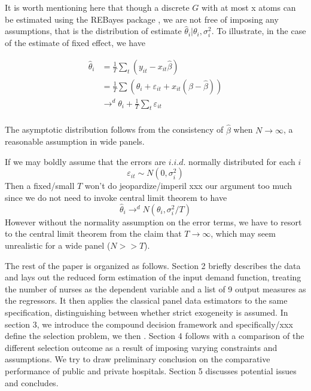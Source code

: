 \documentclass[12pt]{article}
\begin{document}
It is worth mentioning here that though a discrete $G$ with at most x atoms can
be estimated using the REBayes package \cite{koenker2017rebayes}, we are not
free of imposing any assumptions, that is the distribution of estimate
$\hat{\theta}_i|\theta_i,\sigma_i^2.$ To illustrate, in the case of the
estimate of fixed effect, we have

\begin{align*}
    \hat{\theta}_i & =\frac{1}{T}\sum_t (y_{it}-x_{it}\hat{\beta})                         \\
                   & =\frac{1}{T}\sum(\theta_i+\varepsilon_{it}+x_{it}(\beta-\hat{\beta})) \\
                   & \to^d \theta_i+\frac{1}{T}\sum_t \varepsilon_{it}                     \\
\end{align*}

The asymptotic distribution follows from the consistency of $\hat{\beta}$ when
$N \to \infty$, a reasonable assumption in wide panels.

If we may boldly assume that the errors are $i.i.d.$ normally distributed for
each $i$
\begin{equation*}
    \varepsilon_{it} \sim N(0, \sigma_i^2)
\end{equation*}
Then a fixed/small $T$ won't do jeopardize/imperil xxx our argument too much since we do not need to invoke central
limit theorem to have
\begin{equation*}
    \hat{\theta}_i\to^d N(\theta_i,\sigma_i^2/T)
\end{equation*}
However without the normality assumption on the error terms, we have to resort to the
central limit theorem from the claim that $T\to \infty$, which may seem unrealistic for a wide panel ($N>>T$).

The rest of the paper is organized as follows. Section 2 briefly describes the
data and lays out the reduced form estimation of the input demand function,
treating the number of nurses as the dependent variable and a list of 9 output
measures as the regressors. It then applies the classical panel data estimators
to the same specification, distinguishing between whether strict exogeneity is
assumed. In section 3, we introduce the compound decision framework and
specifically/xxx define the selection problem, we then . Section 4 follows with
a comparison of the different selection outcome as a result of imposing varying
constraints and assumptions. We try to draw preliminary conclusion on the
comparative performance of public and private hospitals. Section 5 discusses
potential issues and concludes.
\end{document}
